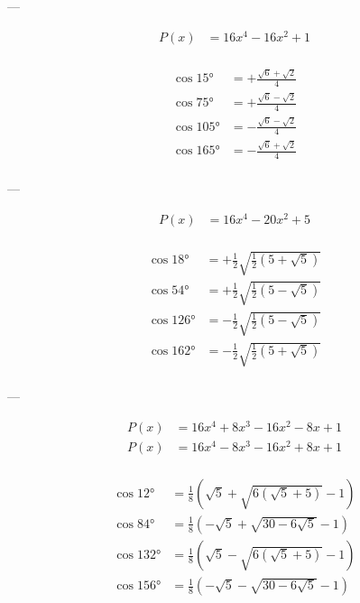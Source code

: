 ---

$$
\begin{aligned}
    P(x) &= 16 x^4-16 x^2+1\\
\end{aligned}
$$

$$
\begin{aligned}
    \cos 15°  &= +\frac{\sqrt{6}+\sqrt{2}}{4}\\
    \cos 75°  &= +\frac{\sqrt{6}-\sqrt{2}}{4}\\
    \cos 105° &= -\frac{\sqrt{6}-\sqrt{2}}{4}\\
    \cos 165° &= -\frac{\sqrt{6}+\sqrt{2}}{4}\\
\end{aligned}
$$

---

$$
\begin{aligned}
    P(x) &= 16 x^4-20 x^2+5\\
\end{aligned}
$$

$$
\begin{aligned}
    \cos 18°  &= +\frac{1}{2} \sqrt{\frac{1}{2} \left(5+\sqrt{5}\right)}\\
    \cos 54°  &= +\frac{1}{2} \sqrt{\frac{1}{2} \left(5-\sqrt{5}\right)}\\
    \cos 126° &= -\frac{1}{2} \sqrt{\frac{1}{2} \left(5-\sqrt{5}\right)}\\
    \cos 162° &= -\frac{1}{2} \sqrt{\frac{1}{2} \left(5+\sqrt{5}\right)}\\
\end{aligned}
$$

---

$$
\begin{aligned}
    P(x) &= 16 x^4+8 x^3-16 x^2-8 x+1\\
    P(x) &= 16 x^4-8 x^3-16 x^2+8 x+1\\
\end{aligned}
$$

$$
\begin{aligned}
    \cos 12°  &= \frac{1}{8} \left(\sqrt{5}+\sqrt{6 \left(\sqrt{5}+5\right)}-1\right)\\
    \cos 84°  &= \frac{1}{8} \left(-\sqrt{5}+\sqrt{30-6 \sqrt{5}}-1\right)\\
    \cos 132° &= \frac{1}{8} \left(\sqrt{5}-\sqrt{6 \left(\sqrt{5}+5\right)}-1\right)\\
    \cos 156° &= \frac{1}{8} \left(-\sqrt{5}-\sqrt{30-6 \sqrt{5}}-1\right)\\
\end{aligned}
$$


